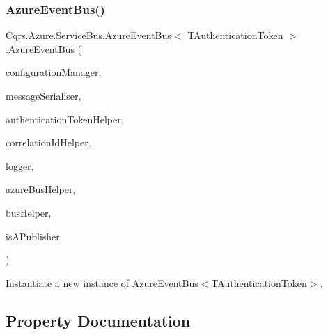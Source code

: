 \subsubsection{\texorpdfstring{Azure\+Event\+Bus()}{AzureEventBus()}}
{\footnotesize\ttfamily \hyperlink{classCqrs_1_1Azure_1_1ServiceBus_1_1AzureEventBus}{Cqrs.\+Azure.\+Service\+Bus.\+Azure\+Event\+Bus}$<$ T\+Authentication\+Token $>$.\hyperlink{classCqrs_1_1Azure_1_1ServiceBus_1_1AzureEventBus}{Azure\+Event\+Bus} (\begin{DoxyParamCaption}\item[{\hyperlink{interfaceCqrs_1_1Configuration_1_1IConfigurationManager}{I\+Configuration\+Manager}}]{configuration\+Manager,  }\item[{\hyperlink{interfaceCqrs_1_1Azure_1_1ServiceBus_1_1IMessageSerialiser}{I\+Message\+Serialiser}$<$ T\+Authentication\+Token $>$}]{message\+Serialiser,  }\item[{\hyperlink{interfaceCqrs_1_1Authentication_1_1IAuthenticationTokenHelper}{I\+Authentication\+Token\+Helper}$<$ T\+Authentication\+Token $>$}]{authentication\+Token\+Helper,  }\item[{I\+Correlation\+Id\+Helper}]{correlation\+Id\+Helper,  }\item[{I\+Logger}]{logger,  }\item[{\hyperlink{interfaceCqrs_1_1Azure_1_1ServiceBus_1_1IAzureBusHelper}{I\+Azure\+Bus\+Helper}$<$ T\+Authentication\+Token $>$}]{azure\+Bus\+Helper,  }\item[{\hyperlink{interfaceCqrs_1_1Bus_1_1IBusHelper}{I\+Bus\+Helper}}]{bus\+Helper,  }\item[{bool}]{is\+A\+Publisher }\end{DoxyParamCaption})\hspace{0.3cm}{\ttfamily [protected]}}



Instantiate a new instance of \hyperlink{classCqrs_1_1Azure_1_1ServiceBus_1_1AzureEventBus_aaaf74d2e4e79924b7231750478508ed6_aaaf74d2e4e79924b7231750478508ed6}{Azure\+Event\+Bus$<$\+T\+Authentication\+Token$>$}. 



\subsection{Property Documentation}
\mbox{\label{classCqrs_1_1Azure_1_1ServiceBus_1_1AzureEventBus_ad1951d2d7ccbf739e9390437d960b3f5_ad1951d2d7ccbf739e9390437d960b3f5}} 
